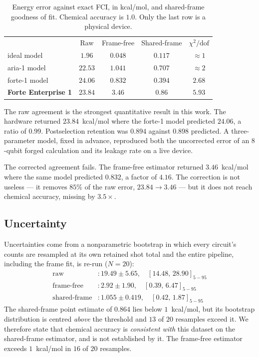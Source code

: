\documentclass[aps,prx,twocolumn,superscriptaddress,nofootinbib,floatfix]{revtex4-2}
\begin{document}
\begin{table}[t]
\caption{Energy error against exact FCI, in kcal/mol, and shared-frame
goodness of fit. Chemical accuracy is $1.0$. Only the last row is a
physical device.}
\label{tab:main}
\begin{ruledtabular}
\begin{tabular}{lcccc}
 & Raw & Frame-free & Shared-frame & $\chi^2/\mathrm{dof}$ \\
\colrule
ideal model        & $1.96$  & $0.048$ & $0.117$ & $\approx1$ \\
aria-1 model       & $22.53$ & $1.041$ & $0.707$ & $\approx2$ \\
forte-1 model      & $24.06$ & $0.832$ & $0.394$ & $2.68$ \\
\textbf{Forte Enterprise 1} & $\mathbf{23.84}$ & $\mathbf{3.46}$ &
$\mathbf{0.86}$ & $\mathbf{5.93}$ \\
\end{tabular}
\end{ruledtabular}
\end{table}

The raw agreement is the strongest quantitative result in this work. The
hardware returned $23.84$~kcal/mol where the forte-1 model predicted
$24.06$, a ratio of $0.99$. Postselection retention was $0.894$ against
$0.898$ predicted. A three-parameter model, fixed in advance, reproduced
both the uncorrected error of an $8$-qubit forged calculation and its
leakage rate on a live device.

The corrected agreement fails. The frame-free estimator returned
$3.46$~kcal/mol where the same model predicted $0.832$, a factor of
$4.16$. The correction is not useless --- it removes $85\%$ of the raw
error, $23.84\to3.46$ --- but it does not reach chemical accuracy, missing
by $3.5\times$.

\subsection{Uncertainty}

Uncertainties come from a nonparametric bootstrap in which every circuit's
counts are resampled at its own retained shot total and the entire
pipeline, including the frame fit, is re-run ($N=20$):
\begin{align}
\text{raw} &: 19.49 \pm 5.65, \quad [14.48,\,28.90]_{5-95} \nonumber\\
\text{frame-free} &: 2.92 \pm 1.90, \quad [0.39,\,6.47]_{5-95} \nonumber\\
\text{shared-frame} &: 1.055 \pm 0.419, \quad [0.42,\,1.87]_{5-95}
\nonumber
\end{align}
The shared-frame point estimate of $0.864$ lies below $1$~kcal/mol, but
its bootstrap distribution is centred \emph{above} the threshold and $13$
of $20$ resamples exceed it. We therefore state that chemical accuracy is
\emph{consistent with} this dataset on the shared-frame estimator, and is
not established by it. The frame-free estimator exceeds $1$~kcal/mol in
$16$ of $20$ resamples.
\end{document}
